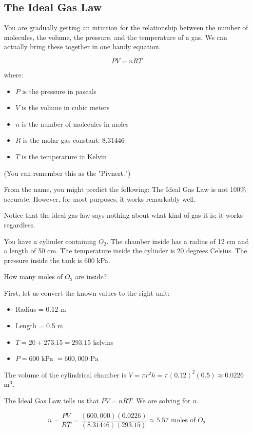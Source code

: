 \subsection{The Ideal Gas Law}
You are gradually getting an intuition for the relationship between the number of molecules, the volume, the pressure, and the temperature of a gas.
We can actually bring these together in one handy equation.

\begin{mdframed}[style=important, frametitle={Ideal Gas Law}]

$$PV = nRT$$

where:
\begin{itemize}
\item $P$ is the pressure in pascals
\item $V$ is the volume in cubic meters
\item $n$ is the number of molecules in moles
\item $R$ is the molar gas constant: 8.31446
\item $T$ is the temperature in Kelvin
\end{itemize}

(You can remember this as the "Pivnert.")

\end{mdframed}

From the name, you might predict the following: The Ideal Gas Law is not 100\% accurate. However, for most purposes, it works remarkably well. 

Notice that the ideal gas law says nothing about what kind of gas it is; it works regardless.

\begin{Exercise}[title={Ideal Gas Law}, label=ideal_gas]
 
You have a cylinder containing $O_2$. The chamber inside has a radius of 12 cm and a length of 50 cm. 
The temperature inside the cylinder is 20 degrees Celsius.
The pressure inside the tank is 600 kPa.

How many moles of $O_2$ are inside?

\end{Exercise}
\begin{Answer}[ref=ideal_gas]

First, let us convert the known values to the right unit:
\begin{itemize}
\item Radius = 0.12 m
\item Length = 0.5 m
\item $T = 20 + 273.15 = 293.15$ kelvins
\item $P = 600 \text{ kPa } = 600,000 \text{ Pa }$
\end{itemize}

The volume of the cylindrical chamber is $V = \pi r^2 h = \pi (0.12)^2 (0.5) \approx 0.0226$ m$^3$.

The Ideal Gas Law tells us that $PV = nRT$. We are solving for $n$.

$$n = \frac{PV}{RT} = \frac{(600,000)(0.0226)}{(8.31446)(293.15)} \approx 5.57 \text{ moles of } O_2$$

\end{Answer}

